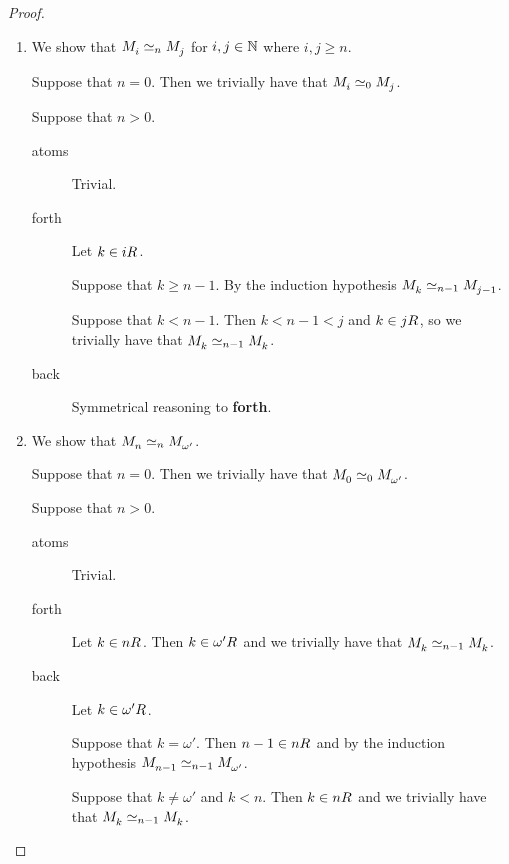 \begin{proof}
\begin{enumerate}
    \item We show that $\kPModel{i} \bisimilar[n] \kPModel{j}$ for $i, j \in \mathbb{N}$ where $i, j \geq n$.

        Suppose that $n = 0$. Then we trivially have that $\kPModel{i} \bisimilar[0] \kPModel{j}$.

        Suppose that $n > 0$.
        \begin{description}
            \item[atoms] Trivial.

            \item[forth] Let $k \in \kSuccessors{}{i}$.

            Suppose that $k \geq n - 1$. By the induction hypothesis $\kPModel{k} \bisimilar [n-1] \kPModel{j - 1}$.

            Suppose that $k < n - 1$. Then $k < n - 1 < j$ and $k \in \kSuccessors{}{j}$, so we trivially have that $\kPModel{k} \bisimilar[n - 1] \kPModel{k}$.

            \item[back] Symmetrical reasoning to {\bf forth}.
        \end{description}

    \item We show that $\kPModel{n} \bisimilar[n] \kPModel{\omega'}$.

        Suppose that $n = 0$. Then we trivially have that $\kPModel{0} \bisimilar[0] \kPModel{\omega'}$.

        Suppose that $n > 0$.

        \begin{description}
            \item[atoms] Trivial.

            \item[forth] Let $k \in \kSuccessors{}{n}$. Then $k \in \kSuccessors{}{\omega'}$ and we trivially have that $\kPModel{k} \bisimilar[n - 1] \kPModel{k}$.

            \item[back] Let $k \in \kSuccessors{}{\omega'}$. 

                Suppose that $k = \omega'$. Then $n - 1 \in \kSuccessors{}{n}$ and by the induction hypothesis $\kPModel{n - 1} \bisimilar[n - 1] \kPModel{\omega'}$. 

                Suppose that $k \neq \omega'$ and $k < n$. Then $k \in \kSuccessors{}{n}$ and we trivially have that $\kPModel{k} \bisimilar[n - 1] \kPModel{k}$.


\end{description}
\end{enumerate}
\end{proof}
